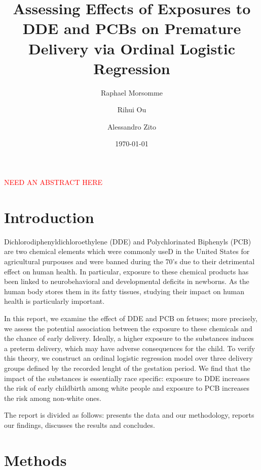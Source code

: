 \documentclass[wcp]{jmlr}%
\title[DDE and PCB effect on Premature delivery]{Assessing Effects of Exposures to DDE and PCBs on Premature Delivery via Ordinal Logistic Regression}	%
\author[Morsomme, Ou, Zito]{Raphael Morsomme \and Rihui Ou \and Alessandro Zito}
\date{\today} %
\begin{document}
\maketitle

\textcolor{red}{NEED AN ABSTRACT HERE}
\newpage
\section{Introduction}
\label{sec:intro}

Dichlorodiphenyldichloroethylene (DDE) and Polychlorinated Biphenyls (PCB) are two chemical elements which were commonly useD in the United States for agricultural purpouses and were banned during the 70's due to their detrimental effect on human health. In particular, exposure to these chemical products has been linked to neurobehavioral and developmental deficits in newborns. As the human body stores them in its fatty tissues, studying their impact on human health is particularly important.

In this report, we examine the effect of DDE and PCB on fetuses; more precisely, we assess the potential association between the exposure to these chemicals and the chance of early delivery. Ideally, a higher exposure to the substances induces a preterm delivery, which may have adverse consequences for the child. To verify this theory, we construct an ordinal logistic regression model over three delivery groups defined by the recorded lenght of the gestation period.  We find that the impact of the substances is essentially race specific: exposure to DDE increases the risk of early childbirth among white people and exposure to PCB increases the risk among non-white ones. 

The report is divided as follows:  presents the data and our methodology,   reports our findings,  discusses the results and concludes.


\section{Methods}
\label{sec:method}
\end{document}
